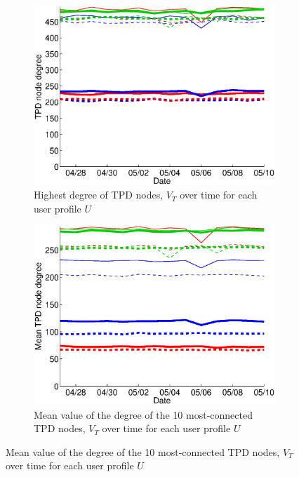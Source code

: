\documentclass{sig-alternate}
\begin{document}
\begin{figure}
  \begin{subfigure}{.38\textwidth}
    \includegraphics[width=\textwidth]{figures/plots/third-mean-top1.eps}
    \caption{Highest degree of TPD nodes, $V_T$ over time for each user profile $U$}
    \label{fig:third_mean_top1_without_entities}
  \end{subfigure}
  \begin{subfigure}{.38\textwidth}
    \includegraphics[width=\textwidth]{figures/plots/third-mean-top10.eps}
    \caption{Mean value of the degree of the 10 most-connected TPD nodes, $V_T$ over time for each user profile $U$}
    \label{fig:third_mean_top10_without_entities}
  \end{subfigure}


\end{figure}
\end{document}
